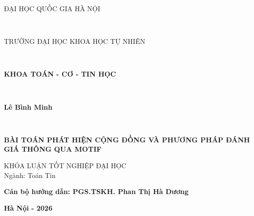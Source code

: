 \thispagestyle{plain}
\thispagestyle{empty}
\thisfancypage{
	\setlength{\fboxsep}{0pt}
	\fbox}{}
	\vspace{1.5 cm}
\begin{center}
\begin{large}
{\fontsize{13pt}{1}\selectfont ĐẠI HỌC QUỐC GIA HÀ NỘI}
\end{large} \\
\begin{large}
{\fontsize{13pt}{1}\selectfont TRƯỜNG ĐẠI HỌC KHOA HỌC TỰ NHIÊN}
\end{large} \\
\begin{large}
{\fontsize{13pt}{1}\selectfont \textbf{KHOA TOÁN - CƠ - TIN HỌC}}
\end{large} \\
\vspace{3 cm}
\begin{large}
{\fontsize{14pt}{1}\selectfont \textbf{Lê Bình Minh}}
\end{large} \\
\end{center}

\vspace{3.5 cm}
\begin{center}
\fontsize{16pt}{1}\selectfont\textbf{BÀI TOÁN PHÁT HIỆN CỘNG ĐỒNG VÀ PHƯƠNG PHÁP ĐÁNH GIÁ THÔNG QUA MOTIF}
\vspace{4 cm}
\end{center}
\begin{center}
{\fontsize{14pt}{1}\selectfont KHÓA LUẬN TỐT NGHIỆP ĐẠI HỌC \\
Ngành: Toán Tin}
\end{center}
\vspace{2 cm}

\begin{center}
{\fontsize{14pt}{1}\selectfont \textbf{Cán bộ hướng dẫn: PGS.TSKH. Phan Thị Hà Dương}}
\end{center}
\vspace{2.5 cm}
\begin{center}
{\fontsize{14pt}{1}\selectfont \textbf{Hà Nội - 2026}}
\end{center}

\clearpage
